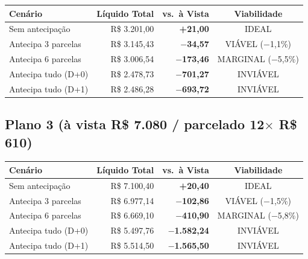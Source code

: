 \documentclass[12pt, a4paper]{article}
\newcommand{\reais}[1]{R\$ #1}
\begin{document}
\begin{table}[H]
    \centering
    \renewcommand{\arraystretch}{1.4}
    \begin{tabularx}{\textwidth}{X r r c}
        \toprule
        \rowcolor{tableHeader} \textbf{Cenário} & \textbf{Líquido Total} & \textbf{vs.\ à Vista} & \textbf{Viabilidade} \\
        \midrule
        Sem antecipação & \reais{3.201,00} & \textcolor{successGreen}{\textbf{+21,00}} & \textcolor{successGreen}{IDEAL} \\
        \rowcolor{lightGray}
        Antecipa 3 parcelas & \reais{3.145,43} & \textcolor{warningOrange}{\textbf{$-$34,57}} & \textcolor{successGreen}{VIÁVEL ($-$1,1\%)} \\
        Antecipa 6 parcelas & \reais{3.006,54} & \textcolor{warningOrange}{\textbf{$-$173,46}} & \textcolor{warningOrange}{MARGINAL ($-$5,5\%)} \\
        \rowcolor{lightGray}
        Antecipa tudo (D+0) & \reais{2.478,73} & \textcolor{dangerRed}{\textbf{$-$701,27}} & \textcolor{dangerRed}{INVIÁVEL} \\
        Antecipa tudo (D+1) & \reais{2.486,28} & \textcolor{dangerRed}{\textbf{$-$693,72}} & \textcolor{dangerRed}{INVIÁVEL} \\
        \bottomrule
    \end{tabularx}
\end{table}

\needspace{8cm}

\subsection{Plano 3 (à vista R\$ 7.080 / parcelado 12$\times$ R\$ 610)}

\begin{table}[H]
    \centering
    \renewcommand{\arraystretch}{1.4}
    \begin{tabularx}{\textwidth}{X r r c}
        \toprule
        \rowcolor{tableHeader} \textbf{Cenário} & \textbf{Líquido Total} & \textbf{vs.\ à Vista} & \textbf{Viabilidade} \\
        \midrule
        Sem antecipação & \reais{7.100,40} & \textcolor{successGreen}{\textbf{+20,40}} & \textcolor{successGreen}{IDEAL} \\
        \rowcolor{lightGray}
        Antecipa 3 parcelas & \reais{6.977,14} & \textcolor{warningOrange}{\textbf{$-$102,86}} & \textcolor{successGreen}{VIÁVEL ($-$1,5\%)} \\
        Antecipa 6 parcelas & \reais{6.669,10} & \textcolor{warningOrange}{\textbf{$-$410,90}} & \textcolor{warningOrange}{MARGINAL ($-$5,8\%)} \\
        \rowcolor{lightGray}
        Antecipa tudo (D+0) & \reais{5.497,76} & \textcolor{dangerRed}{\textbf{$-$1.582,24}} & \textcolor{dangerRed}{INVIÁVEL} \\
        Antecipa tudo (D+1) & \reais{5.514,50} & \textcolor{dangerRed}{\textbf{$-$1.565,50}} & \textcolor{dangerRed}{INVIÁVEL} \\
        \bottomrule
    \end{tabularx}
\end{table}
\end{document}
